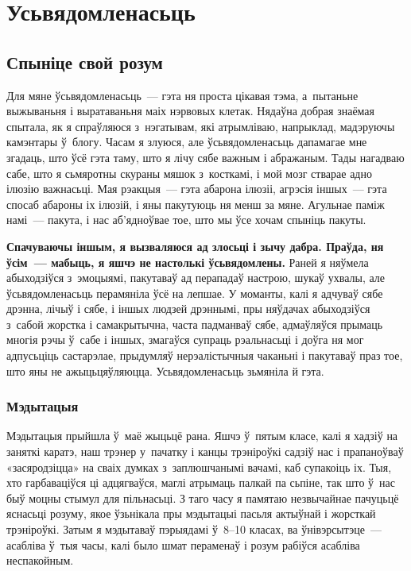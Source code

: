\chapter{Усьвядомленасьць}

\section{Спыніце свой розум}

Для мяне ўсьвядомленасьць~--- гэта ня проста цікавая тэма, а~пытаньне выжываньня і выратаваньня маіх нэрвовых клетак. Нядаўна добрая знаёмая спытала, як я спраўляюся з~нэгатывам, які атрымліваю, напрыклад, мадэруючы камэнтары ў~блогу. Часам я злуюся, але ўсьвядомленасьць дапамагае мне згадаць, што ўсё гэта таму, што я лічу сябе важным і абражаным. Тады нагадваю сабе, што я сьмяротны скураны мяшок з~косткамі, і мой мозг стварае адно ілюзію важнасьці. Мая рэакцыя~--- гэта абарона ілюзіі, агрэсія іншых~--- гэта спосаб абароны іх ілюзій, і яны пакутуюць ня менш за мяне. Агульнае паміж намі~--- пакута, і нас аб'ядноўвае тое, што мы ўсе хочам спыніць пакуты.

\textbf{Спачуваючы іншым, я вызваляюся ад злосьці і зычу дабра. Праўда, ня ўсім~--- мабыць, я яшчэ не настолькі ўсьвядомлены.} Раней я няўмела абыходзіўся з~эмоцыямі, пакутаваў ад перападаў настрою, шукаў ухвалы, але ўсьвядомленасьць перамяніла ўсё на лепшае. У моманты, калі я адчуваў сябе дрэнна, лічыў і сябе, і іншых людзей дрэннымі, пры няўдачах абыходзіўся з~сабой жорстка і самакрытычна, часта падманваў сябе, адмаўляўся прымаць многія рэчы ў~сабе і іншых, змагаўся супраць рэальнасьці і доўга ня мог адпусьціць састарэлае, прыдумляў нерэалістычныя чаканьні і пакутаваў праз тое, што яны не ажыцьцяўляюцца. Усьвядомленасьць зьмяніла й гэта.

\subsection*{Мэдытацыя}

Мэдытацыя прыйшла ў~маё жыцьцё рана. Яшчэ ў~пятым класе, калі я хадзіў на заняткі каратэ, наш трэнер у~пачатку і канцы трэніроўкі садзіў нас і прапаноўваў «засяродзіцца» на сваіх думках з~заплюшчанымі вачамі, каб супакоіць іх. Тыя, хто гарбаваціўся ці адцягваўся, маглі атрымаць палкай па сьпіне, так што ў~нас быў моцны стымул для пільнасьці. З таго часу я памятаю незвычайнае пачуцьцё яснасьці розуму, якое ўзьнікала пры мэдытацыі пасьля актыўнай і жорсткай трэніроўкі. Затым я мэдытаваў пэрыядамі ў~8--10 класах, ва ўнівэрсытэце~--- асабліва ў~тыя часы, калі было шмат пераменаў і розум рабіўся асабліва неспакойным.

